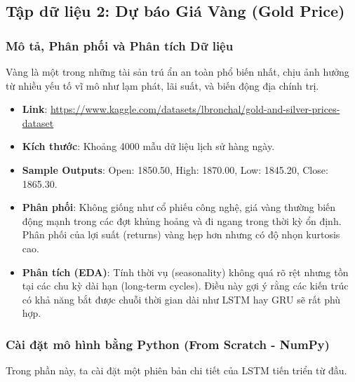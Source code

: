 \documentclass[12pt,a4paper]{article}
\begin{document}
\subsection{Tập dữ liệu 2: Dự báo Giá Vàng (Gold Price)}

\subsubsection{Mô tả, Phân phối và Phân tích Dữ liệu}
Vàng là một trong những tài sản trú ẩn an toàn phổ biến nhất, chịu ảnh hưởng từ nhiều yếu tố vĩ mô như lạm phát, lãi suất, và biến động địa chính trị.
\begin{itemize}
    \item \textbf{Link}: \url{https://www.kaggle.com/datasets/lbronchal/gold-and-silver-prices-dataset}
    \item \textbf{Kích thước}: Khoảng 4000 mẫu dữ liệu lịch sử hàng ngày.
    \item \textbf{Sample Outputs}: Open: 1850.50, High: 1870.00, Low: 1845.20, Close: 1865.30.
    \item \textbf{Phân phối}: Không giống như cổ phiếu công nghệ, giá vàng thường biến động mạnh trong các đợt khủng hoảng và đi ngang trong thời kỳ ổn định. Phân phối của lợi suất (returns) vàng hẹp hơn nhưng có độ nhọn kurtosis cao.
    \item \textbf{Phân tích (EDA)}: Tính thời vụ (seasonality) không quá rõ rệt nhưng tồn tại các chu kỳ dài hạn (long-term cycles). Điều này gợi ý rằng các kiến trúc có khả năng bắt được chuỗi thời gian dài như LSTM hay GRU sẽ rất phù hợp.
\end{itemize}

\subsubsection{Cài đặt mô hình bằng Python (From Scratch - NumPy)}
Trong phần này, ta cài đặt một phiên bản chi tiết của LSTM tiến triển từ đầu.
\end{document}
